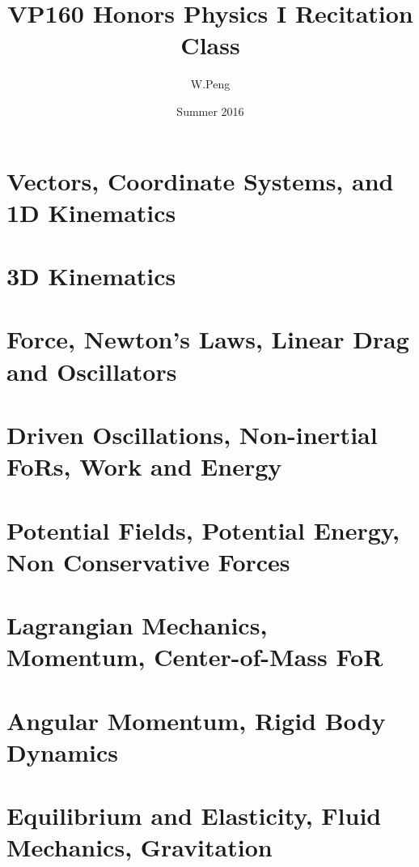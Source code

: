 \documentclass{beamer}
\title{VP160 Honors Physics I Recitation Class}
\author{W.Peng}
\institute{UM-SJTU JI}
\date{Summer 2016}
\begin{document}
\AtBeginSubsection[]
{
   \begin{frame}
        \tableofcontents[sectionstyle=hide/hide,subsectionstyle=show/shaded/hide]
   \end{frame}
}
\newcommand{\unit}[1]{\text{ }\mathrm{#1}}
\newcommand{\derivative}{\mathrm{d}}
\begin{frame}
\titlepage
\end{frame}
\section{Vectors, Coordinate Systems, and 1D Kinematics}
%
\section{3D Kinematics}
%
\section{Force, Newton's Laws, Linear Drag and Oscillators}
%
\section{Driven Oscillations, Non-inertial FoRs, Work and Energy}
%
\section{Potential Fields, Potential Energy, Non Conservative Forces}
%
\section{Lagrangian Mechanics, Momentum, Center-of-Mass FoR}
%
\section{Angular Momentum, Rigid Body Dynamics}
%
\section{Equilibrium and Elasticity, Fluid Mechanics, Gravitation}

\end{document}
